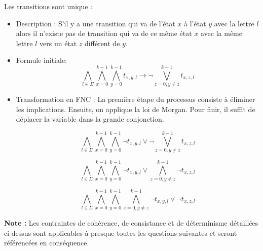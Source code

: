 \begin{tcolorbox}[defaultstyle,title=Contrainte 1]
     Les transitions sont unique :
        \begin{itemize}

        \item Description : S'il y a une transition qui va de l'état $x$ à l'état $y$ avec la lettre $l$ alors il n'existe pas de transition qui va de ce même état $x$ avec la même lettre $l$ vers un état $z$ différent de $y$. \\
        
        \item Formule initiale:
            \[\bigwedge\limits_{l\in \Sigma} \bigwedge\limits_{x=0}^{k-1}\bigwedge\limits_{y=0}^{k-1} t_{x,y,l} \rightarrow \lnot \bigvee\limits_{z=0, y\neq z}^{k-1} t_{x,z,l}\]

        \item Transformation en FNC : La première étape du processus consiste à éliminer les implications. Ensuite, on applique la loi de Morgan. Pour finir, il suffit de déplacer la variable dans la grande conjonction.
            
            \[\bigwedge\limits_{l\in \Sigma} \bigwedge\limits_{x=0}^{k-1}\bigwedge\limits_{y=0}^{k-1} \lnot t_{x,y,l} \lor \lnot \bigvee\limits_{z=0, y\neq z}^{k-1} t_{x,z,l}\]

            \[\bigwedge\limits_{l\in \Sigma} \bigwedge\limits_{x=0}^{k-1}\bigwedge\limits_{y=0}^{k-1} \lnot t_{x,y,l} \lor \bigwedge\limits_{z=0, y\neq z}^{k-1} \lnot t_{x,z,l}\]
            
            \[\bigwedge\limits_{l\in \Sigma} \bigwedge\limits_{x=0}^{k-1}\bigwedge\limits_{y=0}^{k-1} \bigwedge\limits_{z=0, y\neq z}^{k-1} \lnot t_{x,y,l} \lor \lnot t_{x,z,l}\]


        \end{itemize}
    
\end{tcolorbox}

\vspace{1cm}
\textbf{Note :} Les contraintes de cohérence, de consistance et de déterminisme détaillées ci-dessus sont applicables à presque toutes les questions suivantes et seront référencées en conséquence.
\clearpage
